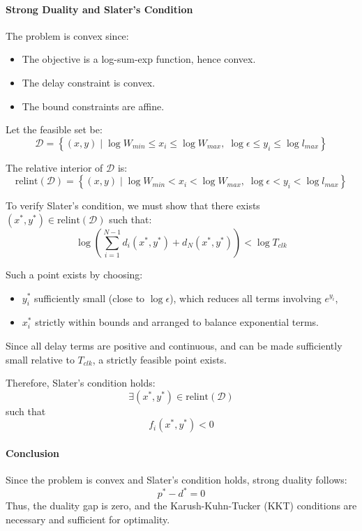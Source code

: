 \documentclass{article}
\begin{document}
\paragraph{Strong Duality and Slater's Condition}
The problem is convex since:
\begin{itemize}
	\item The objective is a log-sum-exp function, hence convex.
	\item The delay constraint is convex.
	\item The bound constraints are affine.
\end{itemize}

Let the feasible set be:
\[
	\mathcal{D} =
	\left\{
	(x,y) \mid
	\log W_{min} \le x_i \le \log W_{max},\;
	\log \epsilon \le y_i \le \log l_{max}
	\right\}
\]

The relative interior of $\mathcal{D}$ is:
\[
	\mathrm{relint}(\mathcal{D}) =
	\left\{
	(x,y) \mid
	\log W_{min} < x_i < \log W_{max},\;
	\log \epsilon < y_i < \log l_{max}
	\right\}
\]

To verify Slater’s condition, we must show that there exists
$(x^\ast, y^\ast) \in \mathrm{relint}(\mathcal{D})$ such that:
\[
	\log \left( \sum_{i=1}^{N-1} d_i(x^\ast,y^\ast) + d_N(x^\ast,y^\ast) \right)
	< \log T_{clk}
\]

Such a point exists by choosing:
\begin{itemize}
	\item $y_i^\ast$ sufficiently small (close to $\log \epsilon$), which reduces all terms involving $e^{y_i}$,
	\item $x_i^\ast$ strictly within bounds and arranged to balance exponential terms.
\end{itemize}

Since all delay terms are positive and continuous, and can be made sufficiently small relative to $T_{clk}$, a strictly feasible point exists.

Therefore, Slater’s condition holds:
\[ \exists (x^\ast, y^\ast) \in \mathrm{relint}(\mathcal{D}) \]
such that \[  f_i(x^\ast,y^\ast) < 0 \]

\paragraph{Conclusion}
Since the problem is convex and Slater’s condition holds, strong duality follows:
\[
	p^\ast - d^\ast = 0
\]
Thus, the duality gap is zero, and the Karush-Kuhn-Tucker (KKT) conditions are necessary and sufficient for optimality.
\end{document}
